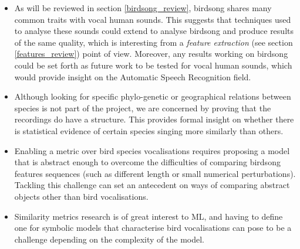 \documentclass[../main.tex]{subfiles}
\begin{document}
\begin{itemize}
\item As will be reviewed in section \ref{birdsong_review}, birdsong shares many common traits with vocal human sounds. This suggests that techniques used to analyse these sounds could extend to analyse birdsong and produce results of the same quality, which is interesting from a \emph{feature extraction} (see section \ref{features_review}) point of view. Moreover, any results working on birdsong could be set forth as future work to be tested for vocal human sounds, which would provide insight on the Automatic Speech Recognition field.
\item Although looking for specific phylo-genetic or geographical relations between species is not part of the project, we are concerned by proving that the recordings do have a structure. This provides formal insight on whether there is statistical evidence of certain species singing more similarly than others.
\item Enabling a metric over bird species vocalisations requires proposing a model that is abstract enough to overcome the difficulties of comparing birdsong features sequences (such as different length or small numerical perturbations). Tackling this challenge can set an antecedent on ways of comparing abstract objects other than bird vocalisations.
\item Similarity metrics research is of great interest to ML, and having to define one for symbolic models that characterise bird vocalisations can pose to be a challenge depending on the complexity of the model. 
\end{itemize}
\end{document}
